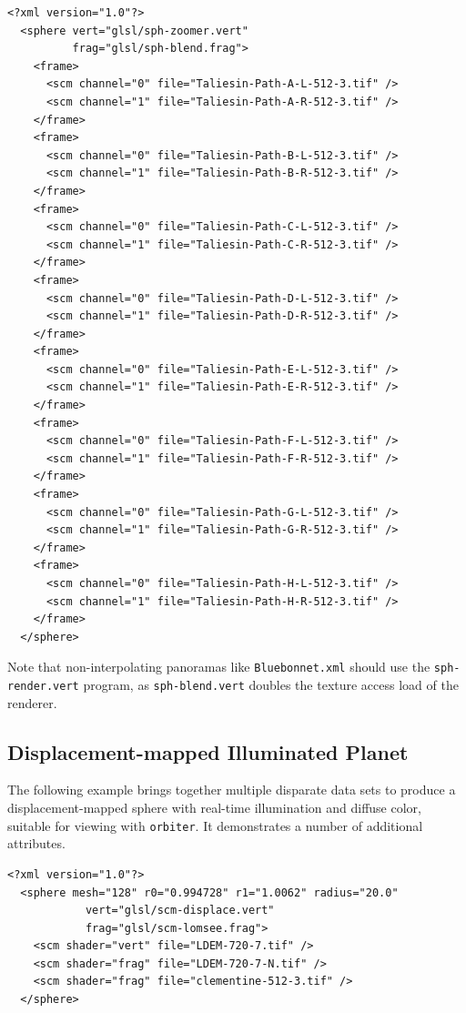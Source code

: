 \documentclass[oneside,10pt]{memoir}
\begin{document}
\begin{Spacing}{1.1}
\begin{Verbatim}
<?xml version="1.0"?>
  <sphere vert="glsl/sph-zoomer.vert"
          frag="glsl/sph-blend.frag">
    <frame>
      <scm channel="0" file="Taliesin-Path-A-L-512-3.tif" />
      <scm channel="1" file="Taliesin-Path-A-R-512-3.tif" />
    </frame>
    <frame>
      <scm channel="0" file="Taliesin-Path-B-L-512-3.tif" />
      <scm channel="1" file="Taliesin-Path-B-R-512-3.tif" />
    </frame>
    <frame>
      <scm channel="0" file="Taliesin-Path-C-L-512-3.tif" />
      <scm channel="1" file="Taliesin-Path-C-R-512-3.tif" />
    </frame>
    <frame>
      <scm channel="0" file="Taliesin-Path-D-L-512-3.tif" />
      <scm channel="1" file="Taliesin-Path-D-R-512-3.tif" />
    </frame>
    <frame>
      <scm channel="0" file="Taliesin-Path-E-L-512-3.tif" />
      <scm channel="1" file="Taliesin-Path-E-R-512-3.tif" />
    </frame>
    <frame>
      <scm channel="0" file="Taliesin-Path-F-L-512-3.tif" />
      <scm channel="1" file="Taliesin-Path-F-R-512-3.tif" />
    </frame>
    <frame>
      <scm channel="0" file="Taliesin-Path-G-L-512-3.tif" />
      <scm channel="1" file="Taliesin-Path-G-R-512-3.tif" />
    </frame>
    <frame>
      <scm channel="0" file="Taliesin-Path-H-L-512-3.tif" />
      <scm channel="1" file="Taliesin-Path-H-R-512-3.tif" />
    </frame>
  </sphere>
\end{Verbatim}

Note that non-interpolating panoramas like \texttt{Bluebonnet.xml} should use the \texttt{sph-render.vert} program, as \texttt{sph-blend.vert} doubles the texture access load of the renderer.

\subsection{Displacement-mapped Illuminated Planet}

The following example brings together multiple disparate data sets to produce a displacement-mapped sphere with real-time illumination and diffuse color, suitable for viewing with \texttt{orbiter}. It demonstrates a number of additional attributes.

\begin{Verbatim}
<?xml version="1.0"?>
  <sphere mesh="128" r0="0.994728" r1="1.0062" radius="20.0"
            vert="glsl/scm-displace.vert"
            frag="glsl/scm-lomsee.frag">
    <scm shader="vert" file="LDEM-720-7.tif" />
    <scm shader="frag" file="LDEM-720-7-N.tif" />
    <scm shader="frag" file="clementine-512-3.tif" />
  </sphere>
\end{Verbatim}


\end{Spacing}
\end{document}
